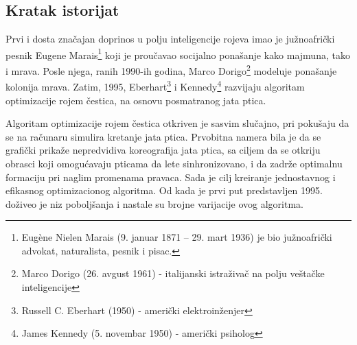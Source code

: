 \documentclass[a4paper]{article}
\begin{document}
\subsection{Kratak istorijat}
Prvi i dosta značajan doprinos u polju inteligencije rojeva imao je južnoafrički pesnik Eugene Marais\footnote{Eugène Nielen Marais (9. januar 1871 – 29. mart 1936) je bio južnoafrički advokat, naturalista, pesnik i pisac.} koji je proučavao socijalno ponašanje kako majmuna, tako i mrava. Posle njega, ranih 1990-ih godina, Marco Dorigo\footnote{Marco Dorigo (26. avgust 1961) - italijanski istraživač na polju veštačke inteligencije} modeluje ponašanje kolonija mrava. Zatim, 1995, Eberhart\footnote{Russell C. Eberhart (1950) - američki elektroinženjer} i Kennedy\footnote{James Kennedy (5. novembar 1950) - američki psiholog} razvijaju algoritam optimizacije rojem čestica, na osnovu posmatranog jata ptica.

 Algoritam optimizacije rojem čestica otkriven je sasvim slučajno, pri pokušaju da se na računaru simulira kretanje jata ptica. Prvobitna namera bila je da se grafički prikaže nepredvidiva koreografija jata ptica, sa ciljem da se otkriju obrasci koji omogućavaju pticama da lete sinhronizovano, i da zadrže optimalnu formaciju pri naglim promenama pravaca. Sada je cilj kreiranje jednostavnog i efikasnog optimizacionog algoritma. Od kada je prvi put predstavljen 1995. doživeo je niz poboljšanja i nastale su brojne varijacije ovog algoritma. 
\end{document}
